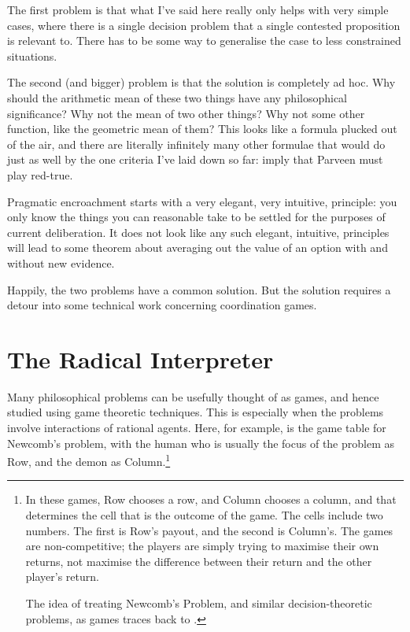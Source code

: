 \documentclass[11pt,]{book}
\let\rmarkdownfootnote\footnote%
\def\footnote{\protect\rmarkdownfootnote}
\begin{document}
The first problem is that what I've said here really only helps with very simple cases, where there is a single decision problem that a single contested proposition is relevant to. There has to be some way to generalise the case to less constrained situations.

The second (and bigger) problem is that the solution is completely ad hoc. Why should the arithmetic mean of these two things have any philosophical significance? Why not the mean of two other things? Why not some other function, like the geometric mean of them? This looks like a formula plucked out of the air, and there are literally infinitely many other formulae that would do just as well by the one criteria I've laid down so far: imply that Parveen must play red-true.

Pragmatic encroachment starts with a very elegant, very intuitive, principle: you only know the things you can reasonable take to be settled for the purposes of current deliberation. It does not look like any such elegant, intuitive, principles will lead to some theorem about averaging out the value of an option with and without new evidence.

Happily, the two problems have a common solution. But the solution requires a detour into some technical work concerning coordination games.

\hypertarget{radicalinterpretation}{%
\section{The Radical Interpreter}\label{radicalinterpretation}}

Many philosophical problems can be usefully thought of as games, and hence studied using game theoretic techniques. This is especially when the problems involve interactions of rational agents. Here, for example, is the game table for Newcomb's problem, with the human who is usually the focus of the problem as Row, and the demon as Column.\footnote{In these games, Row chooses a row, and Column chooses a column, and that determines the cell that is the outcome of the game. The cells include two numbers. The first is Row's payout, and the second is Column's. The games are non-competitive; the players are simply trying to maximise their own returns, not maximise the difference between their return and the other player's return.

  The idea of treating Newcomb's Problem, and similar decision-theoretic problems, as games traces back to \citet{Harper1986}.}
\end{document}
